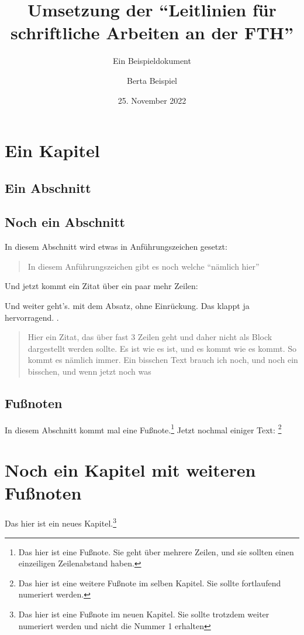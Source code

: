 \documentclass{scrreport}
\begin{document}
\title{Umsetzung der \enquote{Leitlinien für schriftliche Arbeiten an der FTH}}
\subtitle{Ein Beispieldokument}
\author{Berta Beispiel}
\date{25. November 2022}

\maketitle

\tableofcontents

\chapter{Ein Kapitel}
\section{Ein Abschnitt}
\lipsum

\section{Noch ein Abschnitt}
In diesem Abschnitt wird etwas in Anführungszeichen gesetzt: \blockquote{In diesem Anführungszeichen gibt es noch welche \enquote{nämlich hier}}. Und jetzt kommt ein Zitat über ein paar mehr Zeilen: \blockquote{\lipsum[1]} Und weiter geht's. mit dem Absatz, ohne Einrückung. Das klappt ja hervorragend. \lipsum[2]. \blockquote{Hier ein Zitat, das über fast 3 Zeilen geht und daher nicht als Block dargestellt werden sollte. Es ist wie es ist, und es kommt wie es kommt. So kommt es nämlich immer. Ein bisschen Text brauch ich noch, und noch ein bisschen, und wenn jetzt noch was}

\section{Fußnoten}
In diesem Abschnitt kommt mal eine Fußnote.\footnote{Das hier ist eine Fußnote. Sie geht über mehrere Zeilen, und sie sollten einen einzeiligen Zeilenabstand haben. \lipsum[1]} Jetzt nochmal einiger Text: \lipsum[1-9]\footnote{Das hier ist eine weitere Fußnote im selben Kapitel. Sie sollte fortlaufend numeriert werden.}

\chapter{Noch ein Kapitel mit weiteren Fußnoten}
Das hier ist ein neues Kapitel.\footnote{Das hier ist eine Fußnote im neuen Kapitel. Sie sollte trotzdem weiter numeriert werden und nicht die Nummer 1 erhalten}
\end{document}

